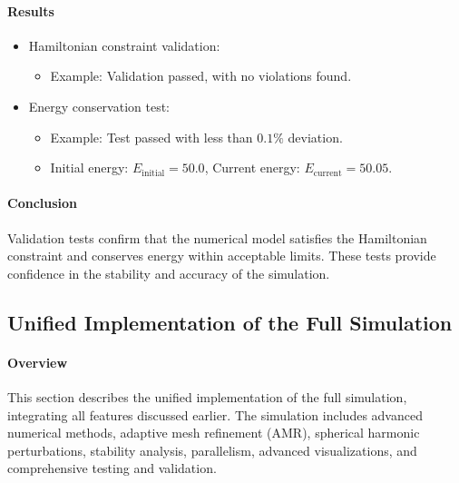 \documentclass[12pt]{article}
\begin{document}
\paragraph{Results}
\begin{itemize}
    \item Hamiltonian constraint validation:
    \begin{itemize}
        \item Example: Validation passed, with no violations found.
    \end{itemize}
    \item Energy conservation test:
    \begin{itemize}
        \item Example: Test passed with less than $0.1\%$ deviation.
        \item Initial energy: $E_{\text{initial}} = 50.0$, Current energy: $E_{\text{current}} = 50.05$.
    \end{itemize}
\end{itemize}

\paragraph{Conclusion}
Validation tests confirm that the numerical model satisfies the Hamiltonian constraint and conserves energy within acceptable limits. These tests provide confidence in the stability and accuracy of the simulation.

\subsection{Unified Implementation of the Full Simulation}

\paragraph{Overview}
This section describes the unified implementation of the full simulation, integrating all features discussed earlier. The simulation includes advanced numerical methods, adaptive mesh refinement (AMR), spherical harmonic perturbations, stability analysis, parallelism, advanced visualizations, and comprehensive testing and validation.
\end{document}
